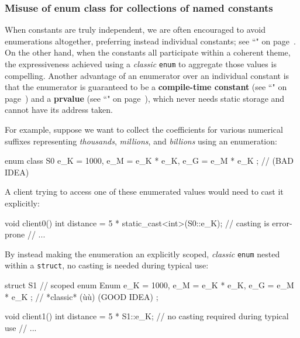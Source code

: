 \subsubsection[Misuse of {\tt enum} {\tt class} for collections of named constants]{Misuse of {\SubsubsecCode enum} {\SubsubsecCode class} for collections of named constants}\label{misuse-of-enum-class-for-collections-of-named-constants}

When constants are truly independent, we are often encouraged to avoid
enumerations altogether, preferring instead individual constants; see
``" on page~\pageref{Default-Member-Initializers}. On the other hand, when the constants all participate within a coherent
theme, the expressiveness achieved using a \emph{classic} \texttt{enum}
to aggregate those values is compelling. Another
advantage of an enumerator over an individual constant is that the
enumerator is guaranteed to be a \textbf{compile-time constant} (see
  ``" on page~\pageref{constexprvar}) and a \textbf{prvalue} (see
  ``" on page~\pageref{Rvalue-References}), which never needs static storage
  and cannot have its address taken.

For example, suppose we want to collect the coefficients for various
numerical suffixes representing \emph{thousands}, \emph{millions}, and
\emph{billions} using an enumeration:

\begin{emcppslisting}[emcppsbatch=e13]
enum class S0 { e_K = 1000, e_M = e_K * e_K, e_G = e_M * e_K };  // (BAD IDEA)
\end{emcppslisting}

\noindent A client trying to access one of these enumerated values would need to
cast it explicitly:

\begin{emcppslisting}[emcppsbatch=e13]
void client0()
{
    int distance = 5 * static_cast<int>(S0::e_K);  // casting is error-prone
    // ...
}
\end{emcppslisting}

\noindent By instead making the enumeration an explicitly scoped, \emph{classic}
\texttt{enum} nested within a \texttt{struct}, no casting is needed
during typical use:

\begin{emcppslisting}
struct S1  // scoped
{
    enum Enum { e_K = 1000, e_M = e_K * e_K, e_G = e_M * e_K };
        // *classic* (ù{}ù) (GOOD IDEA)
};

void client1()
{
    int distance = 5 * S1::e_K;  // no casting required during typical use
    // ...
}
\end{emcppslisting}

